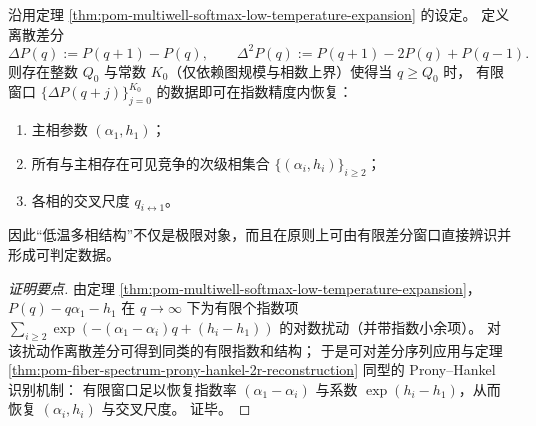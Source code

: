\begin{theorem}\label{thm:pom-multiwell-top-parameter-identifiability}
沿用定理 \ref{thm:pom-multiwell-softmax-low-temperature-expansion} 的设定。
定义离散差分
\[
\Delta P(q):=P(q+1)-P(q),
\qquad
\Delta^2 P(q):=P(q+1)-2P(q)+P(q-1).
\]
则存在整数 \(Q_0\) 与常数 \(K_0\)（仅依赖图规模与相数上界）使得当 \(q\ge Q_0\) 时，
有限窗口 \(\{\Delta P(q+j)\}_{j=0}^{K_0}\) 的数据即可在指数精度内恢复：
\begin{enumerate}
  \item 主相参数 \((\alpha_1,h_1)\)；
  \item 所有与主相存在可见竞争的次级相集合 \(\{(\alpha_i,h_i)\}_{i\ge2}\)；
  \item 各相的交叉尺度 \(q_{i\leftrightarrow1}\)。
\end{enumerate}
因此“低温多相结构”不仅是极限对象，而且在原则上可由有限差分窗口直接辨识并形成可判定数据。
\end{theorem}
\begin{proof}[证明要点]
由定理 \ref{thm:pom-multiwell-softmax-low-temperature-expansion}，
\(
P(q)-q\alpha_1-h_1
\)
在 \(q\to\infty\) 下为有限个指数项
\(\sum_{i\ge2}\exp(-(\alpha_1-\alpha_i)q+(h_i-h_1))\)
的对数扰动（并带指数小余项）。
对该扰动作离散差分可得到同类的有限指数和结构；
于是可对差分序列应用与定理 \ref{thm:pom-fiber-spectrum-prony-hankel-2r-reconstruction} 同型的 Prony--Hankel 识别机制：
有限窗口足以恢复指数率 \((\alpha_1-\alpha_i)\) 与系数 \(\exp(h_i-h_1)\)，从而恢复 \((\alpha_i,h_i)\) 与交叉尺度。
证毕。
\end{proof}

